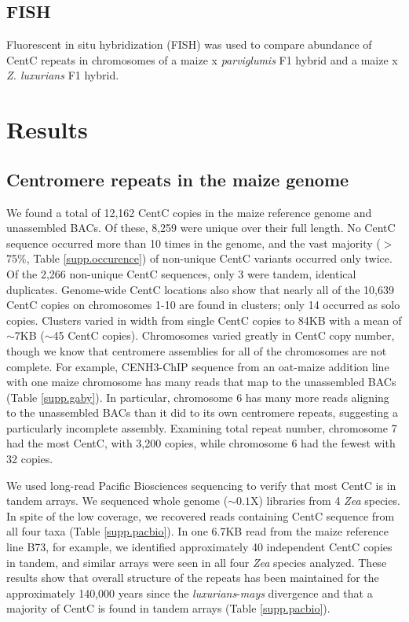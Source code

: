 \subsection*{FISH}

Fluorescent in situ hybridization (FISH) was used to compare abundance of CentC repeats in chromosomes of a maize x \emph{parviglumis} F1 hybrid and a maize x \emph{Z. luxurians} F1 hybrid. 	

\section*{Results}
\label{results}

\subsection*{Centromere repeats in the maize genome}

We found a total of 12,162 CentC copies in the maize reference genome and unassembled BACs.  
Of these, 8,259 were unique over their full length. 
No CentC sequence occurred more than 10 times in the genome, and the vast majority ($>$75\%, Table \ref{supp.occurence}) of non-unique CentC variants occurred only twice.  
Of the 2,266 non-unique CentC sequences, only 3 were tandem, identical duplicates.  
Genome-wide CentC locations also show that nearly all of the 10,639 CentC copies on chromosomes 1-10 are found in clusters; only 14 occurred as solo copies.  
Clusters varied in width from single CentC copies to 84KB with a mean of $\sim$7KB ($\sim$45 CentC copies). 
Chromosomes varied greatly in CentC copy number, though we know that centromere assemblies for all of the chromosomes are not complete.   
For example, CENH3-ChIP sequence from an oat-maize addition line with one maize chromosome \citep{kynast2001} has many reads that map to the unassembled BACs (Table \ref{supp.gaby}).  
In particular, chromosome 6 has many more reads aligning to the unassembled BACs than it did to its own centromere repeats, suggesting a particularly incomplete assembly.  
Examining total repeat number, chromosome 7 had the most CentC, with 3,200 copies, while chromosome 6 had the fewest with 32 copies.

We used long-read Pacific Biosciences sequencing to verify that most CentC is in tandem arrays. We sequenced whole genome ($\sim 0.1$X) libraries from 4 \emph{Zea} species.  In spite of the low coverage, we recovered reads containing CentC sequence from all four taxa (Table \ref{supp.pacbio}).  In one 6.7KB read from the maize reference line B73, for example, we identified approximately 40 independent CentC copies in tandem, and similar arrays were seen in all four \emph{Zea} species analyzed.  These results show that overall structure of the repeats has been maintained for the approximately 140,000 years since the \emph{luxurians}-\emph{mays} divergence \citep{Hanson1996,  Ross-Ibarra2009} and that a majority of CentC is found in tandem arrays (Table \ref{supp.pacbio}).

